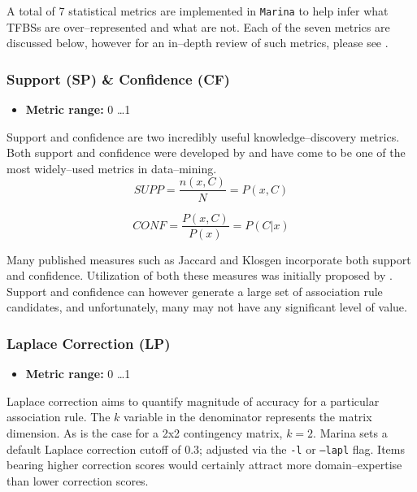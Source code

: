 \documentclass{article}
\begin{document}
A total of 7 statistical metrics are implemented in \texttt{Marina} to help infer what
TFBSs are over--represented and what are not.
Each of the seven metrics are discussed below, however for an in--depth review of
such metrics, please see \cite{geng-acmcomputing-2006}.

\subsubsection{Support (SP) \& Confidence (CF)}
\begin{itemize}
  \item \textbf{Metric range:} 0 \ldots 1
\end{itemize}

Support and confidence are two incredibly useful knowledge--discovery metrics. Both
support and confidence were developed by \cite{agrawal-sigmod-1993} and have
come to be one of the most widely--used metrics in data--mining. 
\begin{equation}
	SUPP = \frac{n(x,C)}{N} = P(x,C)
\end{equation}

\begin{equation}
	CONF = \frac{P(x,C)}{P(x)} = P(C| x)
\end{equation}

Many published measures such as Jaccard and Klosgen incorporate both support 
and confidence. Utilization of both these measures was initially proposed by
\cite{kumar-unpublished-2000}. Support and confidence can however generate
a large set of association rule candidates, and unfortunately, many
may not have any significant level of value.

\subsubsection{Laplace Correction (LP)}
\begin{itemize}
  \item \textbf{Metric range:} 0 \ldots 1
\end{itemize}
Laplace correction aims to
quantify magnitude of accuracy for a particular association rule. The $k$
variable in the denominator represents the matrix dimension. As is the case
for a 2x2 contingency matrix, $k=2$. Marina sets a default Laplace correction
cutoff of 0.3; adjusted via the \texttt{-l} or \texttt{--lapl} flag. Items 
bearing higher correction scores would certainly attract more domain--expertise than
lower correction scores.
\end{document}
